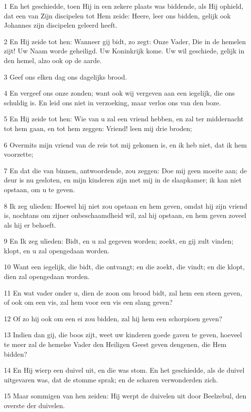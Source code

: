 \par 1 En het geschiedde, toen Hij in een zekere plaats was biddende, als Hij ophield, dat een van Zijn discipelen tot Hem zeide: Heere, leer ons bidden, gelijk ook Johannes zijn discipelen geleerd heeft.
\par 2 En Hij zeide tot hen: Wanneer gij bidt, zo zegt: Onze Vader, Die in de hemelen zijt! Uw Naam worde geheiligd. Uw Koninkrijk kome. Uw wil geschiede, gelijk in den hemel, alzo ook op de aarde.
\par 3 Geef ons elken dag ons dagelijks brood.
\par 4 En vergeef ons onze zonden; want ook wij vergeven aan een iegelijk, die ons schuldig is. En leid ons niet in verzoeking, maar verlos ons van den boze.
\par 5 En Hij zeide tot hen: Wie van u zal een vriend hebben, en zal ter middernacht tot hem gaan, en tot hem zeggen: Vriend! leen mij drie broden;
\par 6 Overmits mijn vriend van de reis tot mij gekomen is, en ik heb niet, dat ik hem voorzette;
\par 7 En dat die van binnen, antwoordende, zou zeggen: Doe mij geen moeite aan; de deur is nu gesloten, en mijn kinderen zijn met mij in de slaapkamer; ik kan niet opstaan, om u te geven.
\par 8 Ik zeg ulieden: Hoewel hij niet zou opstaan en hem geven, omdat hij zijn vriend is, nochtans om zijner onbeschaamdheid wil, zal hij opstaan, en hem geven zoveel als hij er behoeft.
\par 9 En Ik zeg ulieden: Bidt, en u zal gegeven worden; zoekt, en gij zult vinden; klopt, en u zal opengedaan worden.
\par 10 Want een iegelijk, die bidt, die ontvangt; en die zoekt, die vindt; en die klopt, dien zal opengedaan worden.
\par 11 En wat vader onder u, dien de zoon om brood bidt, zal hem een steen geven, of ook om een vis, zal hem voor een vis een slang geven?
\par 12 Of zo hij ook om een ei zou bidden, zal hij hem een schorpioen geven?
\par 13 Indien dan gij, die boos zijt, weet uw kinderen goede gaven te geven, hoeveel te meer zal de hemelse Vader den Heiligen Geest geven dengenen, die Hem bidden?
\par 14 En Hij wierp een duivel uit, en die was stom. En het geschiedde, als de duivel uitgevaren was, dat de stomme sprak; en de scharen verwonderden zich.
\par 15 Maar sommigen van hen zeiden: Hij werpt de duivelen uit door Beelzebul, den overste der duivelen.
